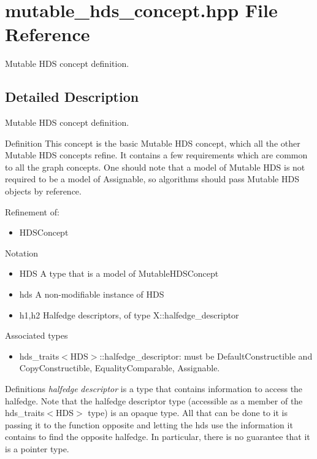 \section{mutable\_\-hds\_\-concept.hpp File Reference}
\label{mutable__hds__concept_8hpp}
Mutable HDS concept definition. 



\subsection{Detailed Description}
Mutable HDS concept definition. 

\begin{Desc}
\item[Definition]This concept is the basic Mutable HDS concept, which all the other Mutable HDS concepts refine. It contains a few requirements which are common to all the graph concepts. One should note that a model of Mutable HDS is not required to be a model of Assignable, so algorithms should pass Mutable HDS objects by reference.\end{Desc}
\begin{Desc}
\item[Refinement of:]\begin{itemize}
\item HDSConcept\end{itemize}
\end{Desc}
\begin{Desc}
\item[Notation]\begin{itemize}
\item HDS A type that is a model of Mutable\-HDSConcept\item hds A non-modifiable instance of HDS\item h1,h2 Halfedge descriptors, of type X::halfedge\_\-descriptor\end{itemize}
\end{Desc}
\begin{Desc}
\item[Associated types]\begin{itemize}
\item hds\_\-traits$<$HDS$>$::halfedge\_\-descriptor: must be Default\-Constructible and Copy\-Constructible, Equality\-Comparable, Assignable.\end{itemize}
\end{Desc}
\begin{Desc}
\item[Definitions]{\em halfedge\/} {\em descriptor\/} is a type that contains information to access the halfedge. Note that the halfedge descriptor type (accessible as a member of the hds\_\-traits$<$HDS$>$ type) is an opaque type. All that can be done to it is passing it to the function opposite and letting the hds use the information it contains to find the opposite halfedge. In particular, there is no guarantee that it is a pointer type.\end{Desc}
